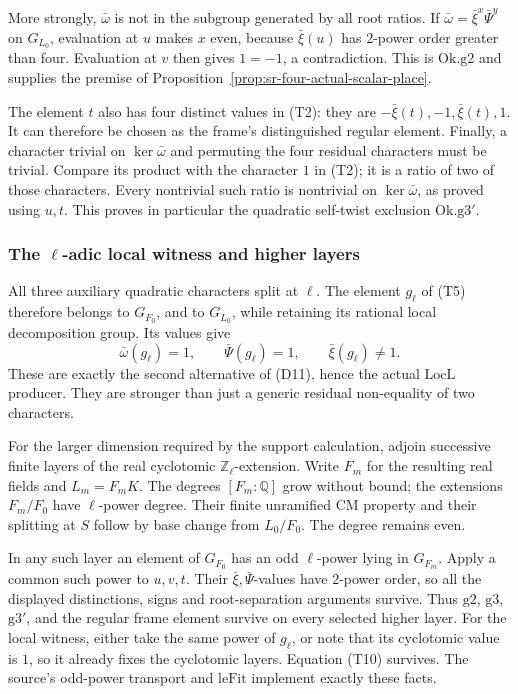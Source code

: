 More strongly,
\(\bar\omega\) is not in the subgroup generated by
all root ratios.
If
\(\bar\omega=\bar\xi^x\bar\Psi^y\) on \(G_{L_0}\),
evaluation at \(u\) makes \(x\) even, because
\(\bar\xi(u)\) has \(2\)-power order greater than four.
Evaluation at \(v\) then gives \(1=-1\), a contradiction.
This is \(\mathrm{Ok.g2}\) and supplies the premise of
Proposition~\ref{prop:sr-four-actual-scalar-place}.

The element \(t\) also has four distinct values in (T2):
they are
\(-\bar\xi(t),-1,\bar\xi(t),1\).
It can therefore be chosen as the frame's distinguished
regular element.
Finally, a character trivial on \(\ker\bar\omega\)
and permuting the four residual characters must be
trivial.
Compare its product with the character \(1\) in (T2);
it is a ratio of two of those characters.
Every nontrivial such ratio is nontrivial on
\(\ker\bar\omega\), as proved using \(u,t\).
This proves in particular the quadratic self-twist
exclusion \(\mathrm{Ok.g3'}\).

\subsubsection{The \(\ell\)-adic local witness and higher layers}
All three auxiliary quadratic characters split at \(\ell\).
The element \(g_\ell\) of (T5) therefore belongs to
\(G_{F_0}\), and to \(G_{L_0}\), while retaining its
rational local decomposition group.
Its values give
\[
          \bar\omega(g_\ell)=1,\qquad
          \bar\Psi(g_\ell)=1,\qquad
                                  \bar\xi(g_\ell)\ne1 .
 \tag{T10}
\]
These are exactly the second alternative of (D11),
hence the actual \(\mathrm{LocL}\) producer.
They are stronger than just a generic residual
non-equality of two characters.

For the larger dimension required by the support
calculation, adjoin successive finite layers of the real
cyclotomic \(\mathbb Z_\ell\)-extension.
Write \(F_m\) for the resulting real fields and
\(L_m=F_mK\).
The degrees \([F_m:\mathbb Q]\) grow without bound;
the extensions \(F_m/F_0\) have \(\ell\)-power degree.
Their finite unramified CM property and their splitting
at \(S\) follow by base change from \(L_0/F_0\).
The degree remains even.

In any such layer an element of \(G_{F_0}\) has an
odd \(\ell\)-power lying in \(G_{F_m}\).
Apply a common such power to \(u,v,t\).
Their \(\bar\xi,\bar\Psi\)-values have \(2\)-power order,
so all the displayed distinctions, signs and
root-separation arguments survive.
Thus \(\mathrm{g2}\), \(\mathrm{g3}\),
\(\mathrm{g3'}\), and the regular frame element survive
on every selected higher layer.
For the local witness, either take the same power of
\(g_\ell\), or note that its cyclotomic value is \(1\),
so it already fixes the cyclotomic layers.
Equation (T10) survives.
The source's odd-power transport and
\(\mathrm{leFit}\) implement exactly these facts.

